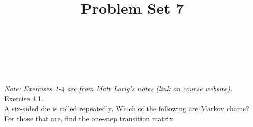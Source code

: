 \documentclass[10pt]{amsart}
\begin{document}
\noindent
{} \\
 \\
 \\
\title{Problem Set 7}
\maketitle

{\it Note: Exercises 1-4 are from Matt Lorig's
notes (link on course website).}
\\

 Exercise 4.1. \\
A six-sided die is rolled repeatedly. Which of the following are Markov chains? For those
that are, find the one-step transition matrix.\\
\end{document}
